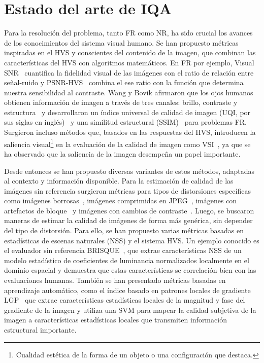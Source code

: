 \section{Estado del arte de IQA}
Para la resolución del problema, tanto FR como NR, ha sido crucial los avances de los conocimientos 
del sistema visual humano. Se han propuesto métricas inspiradas en el HVS y 
conscientes del contenido de la imagen, que combinan las características del HVS 
con algoritmos matemáticos. En FR por ejemplo, Visual SNR~\cite{VSNR} cuantifica 
la fidelidad visual de las imágenes con el ratio de relación entre señal-ruido y 
PSNR-HVS~\cite{PSNR-HVS} combina el ese ratio con la función que determina 
nuestra sensibilidad al contraste. 
Wang y Bovik afirmaron que los ojos humanos obtienen información de imagen a 
través de tres canales: brillo, contraste y estructura~\cite{SSIM} y desarrollaron 
un índice universal de calidad de imagen (UQI, por sus siglas en inglés)~\cite{UQI} y una similitud 
estructural (SSIM)~\cite{SSIM} para problemas FR. Surgieron incluso métodos que, basados en las 
respuestas del HVS, introducen la saliencia visual\footnote{
  Cualidad estética de la forma de un objeto o una configuración que destaca.
} en la evaluación de la calidad de imagen como VSI~\cite{VSI}, 
ya que se ha observado que la saliencia de la imagen desempeña un papel importante.

Desde entonces se han propuesto diversas variantes de estos métodos, adaptadas 
al contexto y información disponible. 
Para la estimación de calidad de las imágenes sin referencia surgieron métricas para 
tipos de distorsiones específicas como 
imágenes borrosas~\cite{GradientBasedBlurAssessment}, 
imágenes comprimidas en JPEG~\cite{JPEGBasedOnLuminance}, 
imágenes con artefactos de bloque~\cite{DeblockedImages} y imágenes con 
cambios de contraste~\cite{ContrastDistorted}.
Luego, se buscaron maneras de estimar la calidad de imágenes de forma más genérica, 
sin depender del tipo de distorsión. Para ello, se han propuesto varias métricas 
basadas en estadísticas de escenas naturales (NSS) y el sistema HVS. 
Un ejemplo conocido es el evaluador sin referencia BRISQUE~\cite{BRISQUE}, que extrae 
características NSS de un modelo estadístico de coeficientes de luminancia 
normalizados localmente en el dominio espacial y demuestra que estas características 
se correlación bien con las evaluaciones humanas.
También se han presentado métricas basadas en aprendizaje automático, 
como el índice basado en patrones locales de gradiente LGP~\cite{LGP} que extrae 
características estadísticas locales de la magnitud y fase del gradiente de la imagen y utiliza una 
SVM para mapear la calidad subjetiva de la imagen a 
características estadísticas locales que transmiten información estructural importante.

